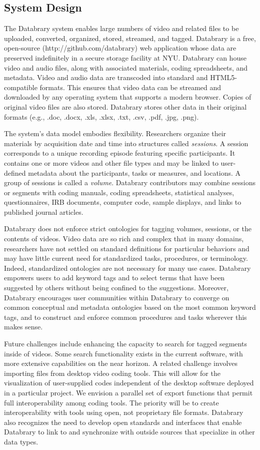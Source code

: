 \documentclass[letterpaper,man,apacite]{apa6}
\begin{document}
\subsection{System Design}
The Databrary system enables large numbers of video and related files to be uploaded, converted, organized, stored, streamed, and tagged. 
Databrary is a free, open-source (http://github.com/databrary) web application whose data are preserved indefinitely in a secure storage facility at NYU. 
Databrary can house video and audio files, along with associated materials, coding spreadsheets, and metadata. 
Video and audio data are transcoded into standard and HTML5-compatible formats. 
This ensures that video data can be streamed and downloaded by any operating system that supports a modern browser. 
Copies of original video files are also stored. 
Databrary stores other data in their original formats (e.g., .doc, .docx, .xls, .xlsx, .txt, .csv, .pdf, .jpg, .png). 

The system’s data model embodies flexibility. 
Researchers organize their materials by acquisition date and time into structures called \emph{sessions}. 
A session corresponds to a unique recording episode featuring specific participants.
It contains one or more videos and other file types and may be linked to user-defined metadata about the participants, tasks or measures, and locations.  
A group of sessions is called a \emph{volume}.
Databrary contributors may combine sessions or segments with coding manuals, coding spreadsheets, statistical analyses, questionnaires, IRB documents, computer code, sample displays, and links to published journal articles.

Databrary does not enforce strict ontologies for tagging volumes, sessions, or the contents of videos. 
Video data are so rich and complex that in many domains, researchers have not settled on standard definitions for particular behaviors and may have little current need for standardized tasks, procedures, or terminology. 
Indeed, standardized ontologies are not necessary for many use cases. 
Databrary empowers users to add keyword tags and to select terms that have been suggested by others without being confined to the suggestions. 
Moreover, Databrary encourages user communities within Databrary to converge on common conceptual and metadata ontologies based on the most common keyword tags, and to construct and enforce common procedures and tasks wherever this makes sense. 

Future challenges include enhancing the capacity to search for tagged segments inside of videos. 
Some search functionality exists in the current software, with more extensive capabilities on the near horizon. 
A related challenge involves importing files from desktop video coding tools.
This will allow for the visualization of user-supplied codes independent of the desktop software deployed in a particular project. 
We envision a parallel set of export functions that permit full interoperability among coding tools.
The priority will be to create interoperability with tools using open, not proprietary file formats. 
Databrary also recognizes the need to develop open standards and interfaces that enable Databrary to link to and synchronize with outside sources that specialize in other data types.
\end{document}
